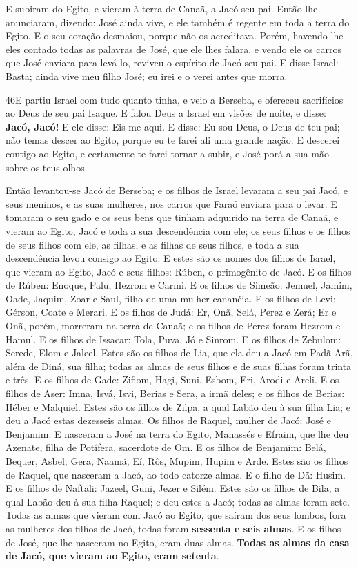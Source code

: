 E subiram do Egito, e vieram à terra de Canaã, a Jacó seu pai.
Então lhe anunciaram, dizendo: José ainda vive, e ele também
é regente em toda a terra do Egito. E o seu coração desmaiou, porque
não os acreditava. Porém, havendo-lhe eles contado todas as
palavras de José, que ele lhes falara, e vendo ele os carros que
José enviara para levá-lo, reviveu o espírito de Jacó seu pai.
E disse Israel: Basta; ainda vive meu filho José; eu irei e o
verei antes que morra.

\smallskip

\lettrine{46} E partiu Israel com tudo quanto tinha, e veio a
Berseba, e ofereceu sacrifícios ao Deus de seu pai Isaque. E
falou Deus a Israel em visões de noite, e disse: \textbf{Jacó,
Jacó!} E ele disse: Eis-me aqui. E disse: Eu sou Deus, o Deus de
teu pai; não temas descer ao Egito, porque eu te farei ali uma
grande nação. E descerei contigo ao Egito, e certamente te farei
tornar a subir, e José porá a sua mão sobre os teus olhos.

Então levantou-se Jacó de Berseba; e os filhos de Israel levaram a
seu pai Jacó, e seus meninos, e as suas mulheres, nos carros que
Faraó enviara para o levar. E tomaram o seu gado e os seus bens
que tinham adquirido na terra de Canaã, e vieram ao Egito, Jacó e
toda a sua descendência com ele; os seus filhos e os filhos de
seus filhos com ele, as filhas, e as filhas de seus filhos, e toda a
sua descendência levou consigo ao Egito. E estes são os nomes
dos filhos de Israel, que vieram ao Egito, Jacó e seus filhos:
Rúben, o primogênito de Jacó. E os filhos de Rúben: Enoque,
Palu, Hezrom e Carmi. E os filhos de Simeão: Jemuel, Jamim,
Oade, Jaquim, Zoar e Saul, filho de uma mulher cananéia. E os
filhos de Levi: Gérson, Coate e Merari. E os filhos de Judá:
Er, Onã, Selá, Perez e Zerá; Er e Onã, porém, morreram na terra de
Canaã; e os filhos de Perez foram Hezrom e Hamul. E os filhos
de Issacar: Tola, Puva, Jó e Sinrom. E os filhos de Zebulom:
Serede, Elom e Jaleel. Estes são os filhos de Lia, que ela
deu a Jacó em Padã-Arã, além de Diná, sua filha; todas as almas de
seus filhos e de suas filhas foram trinta e três. E os filhos
de Gade: Zifiom, Hagi, Suni, Esbom, Eri, Arodi e Areli. E os
filhos de Aser: Imna, Isvá, Isvi, Berias e Sera, a irmã deles; e os
filhos de Berias: Héber e Malquiel. Estes são os filhos de
Zilpa, a qual Labão deu à sua filha Lia; e deu a Jacó estas
dezesseis almas. Os filhos de Raquel, mulher de Jacó: José e
Benjamim. E nasceram a José na terra do Egito, Manassés e
Efraim, que lhe deu Azenate, filha de Potífera, sacerdote de Om.
E os filhos de Benjamim: Belá, Bequer, Asbel, Gera, Naamã,
Eí, Rôs, Mupim, Hupim e Arde. Estes são os filhos de Raquel,
que nasceram a Jacó, ao todo catorze almas. E o filho de Dã:
Husim. E os filhos de Naftali: Jazeel, Guni, Jezer e Silém.
Estes são os filhos de Bila, a qual Labão deu à sua filha
Raquel; e deu estes a Jacó; todas as almas foram sete. Todas
as almas que vieram com Jacó ao Egito, que saíram dos seus lombos,
fora as mulheres dos filhos de Jacó, todas foram \textbf{sessenta e
seis almas}. E os filhos de José, que lhe nasceram no Egito,
eram duas almas. \textbf{Todas as almas da casa de Jacó, que vieram
ao Egito, eram setenta}.

